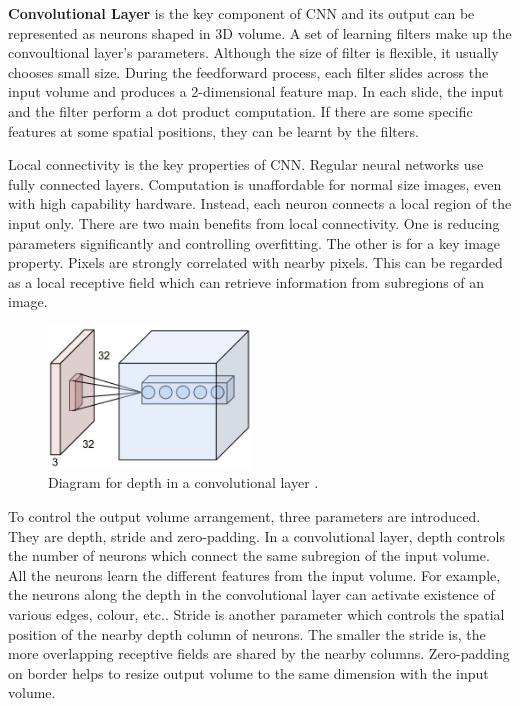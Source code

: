 \textbf{Convolutional Layer} is the key component of CNN and its output can be represented as neurons shaped in 3D volume. A set of learning filters make up the convoultional layer's parameters. Although the size of filter is flexible, it usually chooses small size. During the feedforward process, each filter slides across the input volume and produces a $2$-dimensional feature map. In each slide, the input and the filter perform a dot product computation. If there are some specific features at some spatial positions, they can be learnt by the filters.

Local connectivity is the key properties of CNN. Regular neural networks use fully connected layers. Computation is unaffordable for normal size images, even with high capability hardware. Instead, each neuron connects a local region of the input only. There are two main benefits from local connectivity. One is reducing parameters significantly and controlling overfitting. The other is for a key image property. Pixels are strongly correlated with nearby pixels. This can be regarded as a local receptive field which can retrieve information from subregions of an image.

\graphicspath{ {./Figures/} }
\begin{figure}
  \begin{center}
    \includegraphics[width=0.48\textwidth]{depthcol.jpeg}
  \end{center}
  \caption{Diagram for depth in a convolutional layer \citep{CNNDiagram}.}
\end{figure}
To control the output volume arrangement, three parameters are introduced. They are depth, stride and zero-padding. In a convolutional layer, depth controls the number of neurons which connect the same subregion of the input volume. All the neurons learn the different features from the input volume. For example, the neurons along the depth in the convolutional layer can activate existence of various edges, colour, etc.. Stride is another parameter which controls the spatial position of the nearby depth column of neurons. The smaller the stride is, the more overlapping receptive fields are shared by the nearby columns. Zero-padding on border helps to resize output volume to the same dimension with the input volume.

